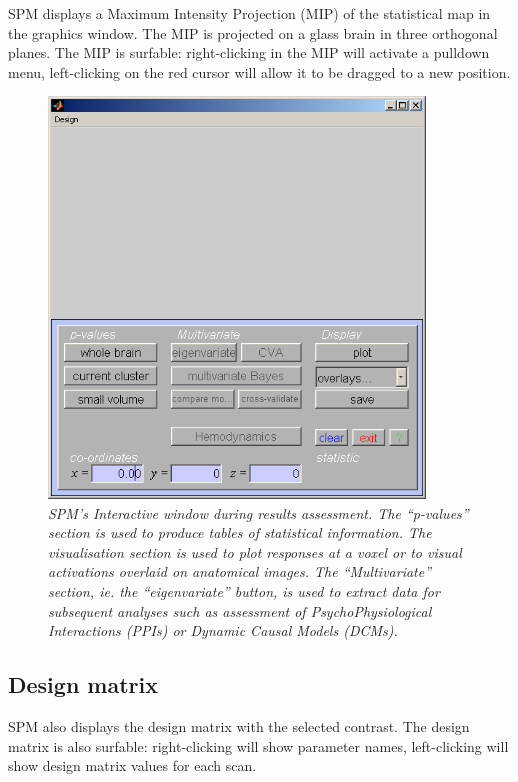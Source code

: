 SPM displays a Maximum Intensity Projection (MIP) of the statistical map in the graphics window. The MIP is projected on a glass brain in three orthogonal planes. The MIP is surfable: right-clicking in the MIP will activate a pulldown menu, left-clicking  on the red cursor will allow it to be dragged to a new position.

\begin{figure}
\begin{center}
\includegraphics[width=100mm]{auditory/interactive}
\caption{\em SPM's Interactive window during results assessment. The ``p-values'' section is used to produce tables of statistical information. The visualisation section is used to plot responses at a voxel or to visual activations overlaid on anatomical images. The ``Multivariate'' section, ie. the ``eigenvariate'' button, is used to extract data for subsequent analyses such as assessment of PsychoPhysiological Interactions (PPIs) or Dynamic  Causal Models (DCMs).}
\end{center}
\end{figure}

\subsection{Design matrix}

SPM also displays the design matrix with the selected contrast. The design matrix is also surfable: right-clicking will show parameter names, left-clicking will show design matrix values for each scan. 

